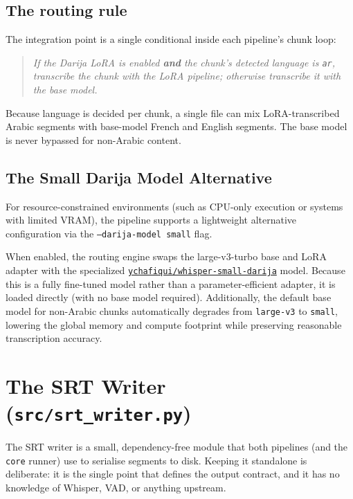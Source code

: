 \documentclass[11pt,a4paper]{report}
\newcommand{\code}[1]{\texttt{\small #1}}
\begin{document}
\section{The routing rule}

The integration point is a single conditional inside each pipeline's chunk loop:

\begin{quote}\itshape
If the Darija LoRA is enabled \textbf{and} the chunk's detected language is
\code{ar}, transcribe the chunk with the LoRA pipeline; otherwise transcribe it
with the base model.
\end{quote}

Because language is decided per chunk, a single file can mix LoRA-transcribed
Arabic segments with base-model French and English segments. The base model is
never bypassed for non-Arabic content.

\section{The Small Darija Model Alternative}

For resource-constrained environments (such as CPU-only execution or systems with limited VRAM), the pipeline supports a lightweight alternative configuration via the \code{--darija-model small} flag. 

When enabled, the routing engine swaps the large-v3-turbo base and LoRA adapter with the specialized \href{https://huggingface.co/ychafiqui/whisper-small-darija}{\code{ychafiqui/whisper-small-darija}} model. Because this is a fully fine-tuned model rather than a parameter-efficient adapter, it is loaded directly (with no base model required). Additionally, the default base model for non-Arabic chunks automatically degrades from \code{large-v3} to \code{small}, lowering the global memory and compute footprint while preserving reasonable transcription accuracy.

\chapter{The SRT Writer (\texttt{src/srt\_writer.py})}
\label{ch:srt}

The SRT writer is a small, dependency-free module that both pipelines (and the
\texttt{core} runner) use to serialise segments to disk. Keeping it standalone is
deliberate: it is the single point that defines the output contract, and it has no
knowledge of Whisper, VAD, or anything upstream.
\end{document}
